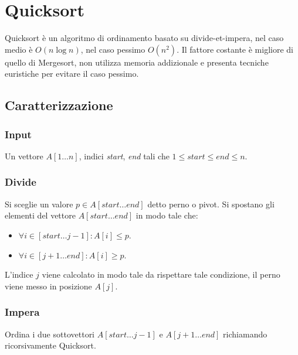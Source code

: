 \section{Quicksort}
Quicksort \`e un algoritmo di ordinamento basato su divide-et-impera, nel caso medio \`e $O(n\log n)$, nel caso pessimo $O(n^2)$. Il fattore costante \`e migliore di quello di Mergesort, non utilizza memoria
addizionale e presenta tecniche euristiche per evitare il caso pessimo.
\subsection{Caratterizzazione}
\subsubsection{Input}
Un vettore $A[1\dots n]$, indici \emph{start}, \emph{end} tali che $1\le start\le end\le n$.
\subsubsection{Divide}
Si sceglie un valore $p\in A[start\dots end]$ detto perno o pivot. Si spostano gli elementi del vettore $A[start\dots end]$ in modo tale che:
\begin{itemize}
\item $\forall i\in [start\dots j-1]: A[i]\le p$.
\item $\forall i\in [j+1\dots end]: A[i]\ge p$.
\end{itemize}
L'indice $j$ viene calcolato in modo tale da rispettare tale condizione, il perno viene messo in posizione $A[j]$. 
\subsubsection{Impera}
Ordina i due sottovettori $A[start\dots j-1]$ e $A[j+1\dots end]$ richiamando ricorsivamente Quicksort.
